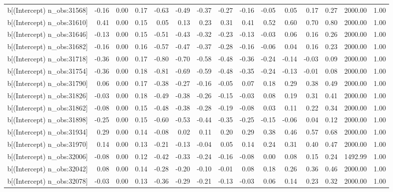 \begin{table}[ht]
\begin{tabular}{rrrrrrrrrrrrrrr}
  b[(Intercept) n\_obs:31568] & -0.16 & 0.00 & 0.17 & -0.63 & -0.49 & -0.37 & -0.27 & -0.16 & -0.05 & 0.05 & 0.17 & 0.27 & 2000.00 & 1.00 \\ 
  b[(Intercept) n\_obs:31610] & 0.41 & 0.00 & 0.15 & 0.05 & 0.13 & 0.23 & 0.31 & 0.41 & 0.52 & 0.60 & 0.70 & 0.80 & 2000.00 & 1.00 \\ 
  b[(Intercept) n\_obs:31646] & -0.13 & 0.00 & 0.15 & -0.51 & -0.43 & -0.32 & -0.23 & -0.13 & -0.03 & 0.06 & 0.16 & 0.26 & 2000.00 & 1.00 \\ 
  b[(Intercept) n\_obs:31682] & -0.16 & 0.00 & 0.16 & -0.57 & -0.47 & -0.37 & -0.28 & -0.16 & -0.06 & 0.04 & 0.16 & 0.23 & 2000.00 & 1.00 \\ 
  b[(Intercept) n\_obs:31718] & -0.36 & 0.00 & 0.17 & -0.80 & -0.70 & -0.58 & -0.48 & -0.36 & -0.24 & -0.14 & -0.03 & 0.09 & 2000.00 & 1.00 \\ 
  b[(Intercept) n\_obs:31754] & -0.36 & 0.00 & 0.18 & -0.81 & -0.69 & -0.59 & -0.48 & -0.35 & -0.24 & -0.13 & -0.01 & 0.08 & 2000.00 & 1.00 \\ 
  b[(Intercept) n\_obs:31790] & 0.06 & 0.00 & 0.17 & -0.38 & -0.27 & -0.16 & -0.05 & 0.07 & 0.18 & 0.29 & 0.38 & 0.49 & 2000.00 & 1.00 \\ 
  b[(Intercept) n\_obs:31826] & -0.03 & 0.00 & 0.18 & -0.49 & -0.38 & -0.26 & -0.15 & -0.03 & 0.08 & 0.19 & 0.31 & 0.41 & 2000.00 & 1.00 \\ 
  b[(Intercept) n\_obs:31862] & -0.08 & 0.00 & 0.15 & -0.48 & -0.38 & -0.28 & -0.19 & -0.08 & 0.03 & 0.11 & 0.22 & 0.34 & 2000.00 & 1.00 \\ 
  b[(Intercept) n\_obs:31898] & -0.25 & 0.00 & 0.15 & -0.60 & -0.53 & -0.44 & -0.35 & -0.25 & -0.15 & -0.06 & 0.04 & 0.12 & 2000.00 & 1.00 \\ 
  b[(Intercept) n\_obs:31934] & 0.29 & 0.00 & 0.14 & -0.08 & 0.02 & 0.11 & 0.20 & 0.29 & 0.38 & 0.46 & 0.57 & 0.68 & 2000.00 & 1.00 \\ 
  b[(Intercept) n\_obs:31970] & 0.14 & 0.00 & 0.13 & -0.21 & -0.13 & -0.04 & 0.05 & 0.14 & 0.24 & 0.31 & 0.40 & 0.47 & 2000.00 & 1.00 \\ 
  b[(Intercept) n\_obs:32006] & -0.08 & 0.00 & 0.12 & -0.42 & -0.33 & -0.24 & -0.16 & -0.08 & 0.00 & 0.08 & 0.15 & 0.24 & 1492.99 & 1.00 \\ 
  b[(Intercept) n\_obs:32042] & 0.08 & 0.00 & 0.14 & -0.28 & -0.20 & -0.10 & -0.01 & 0.08 & 0.18 & 0.26 & 0.36 & 0.46 & 2000.00 & 1.00 \\ 
  b[(Intercept) n\_obs:32078] & -0.03 & 0.00 & 0.13 & -0.36 & -0.29 & -0.21 & -0.13 & -0.03 & 0.06 & 0.14 & 0.23 & 0.32 & 2000.00 & 1.00 \\ 

\end{tabular}
\end{table}
